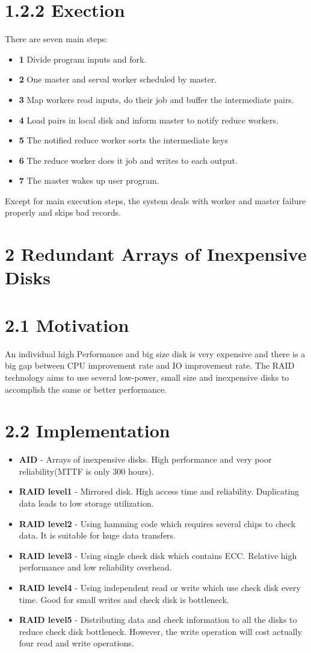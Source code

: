 \documentclass[a4paper]{article}
\begin{document}
 \section*{1.2.2 Exection}
 There are seven main steps:
 \begin{itemize}
 \item \textbf{1} Divide program inputs and fork.
 \item \textbf{2} One master and serval worker scheduled by master.
 \item \textbf{3} Map workers read inputs, do their job and  buffer the intermediate pairs.
 \item \textbf{4} Load pairs in local disk and inform master to notify reduce workers.
 \item \textbf{5} The notified reduce worker sorts the intermediate keys
 \item \textbf{6} The reduce worker does it job and writes to each output.
 \item \textbf{7} The master wakes up user program.
 \end{itemize}
 Except for main execution steps, the system deals with worker and master failure properly and skips bad records.
 \section*{2 Redundant Arrays of Inexpensive Disks}
 \section*{2.1 Motivation}
 An individual high Performance and big size disk is very expensive and there is a big gap between CPU improvement rate and IO improvement rate. The RAID technology aims to use several low-power, small size and inexpensive disks to accomplish the same or better performance.
 \section*{2.2 Implementation}
 \begin{itemize}
 \item \textbf{AID} - Arrays of inexpensive disks. High performance and very poor reliability(MTTF is only 300 hours).
 \item \textbf{RAID level1} - Mirrored disk. High access time and reliability. Duplicating data leads to low storage utilization.
 \item \textbf{RAID level2} - Using hamming code which requires several chips to check data. It is suitable for huge data transfers.
 \item \textbf{RAID level3} - Using single check disk which contains ECC. Relative high performance and low reliability overhead.
 \item \textbf{RAID level4} - Using independent read or write which use check disk every time. Good for small writes and check disk is bottleneck.
 \item \textbf{RAID level5} - Distributing data and check information to all the disks to reduce check disk bottleneck. However, the write operation will cost actually four read and write operations.
 \end{itemize}
\end{document}
